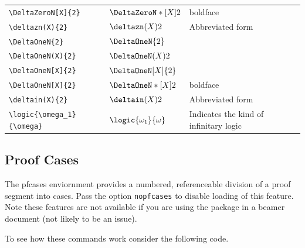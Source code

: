 \documentclass[leqno,11pt]{amsart}
\newcommand{\tab}{\hspace{1cm}}
\begin{document}
\begin{xtabular}{l |  l | l}
	\tab \verb=\DeltaZeroN[X]{2}=           & \( \DeltaZeroN*[X]{2}     \)      & boldface  \\ 
	\tab \verb=\deltazn(X){2}= 							& \( \deltazn(X){2}     \)      & Abbreviated form \\ \midrule
	\verb=\DeltaOneN{2}=                   & \( \DeltaOneN{2}        \)      & \\ 
	\tab \verb=\DeltaOneN(X){2}=           & \( \DeltaOneN(X){2}     \)      & \\ 
	\tab \verb=\DeltaOneN[X]{2}=           & \( \DeltaOneN[X]{2}     \)      & \\
	\tab \verb=\DeltaOneN[X]{2}=           & \( \DeltaOneN*[X]{2}     \)      & boldface  \\ 
	\tab \verb=\deltain(X){2}= 							& \( \deltain(X){2}     \)      & Abbreviated form \\ \midrule

	
	\verb=\logic{\omega_1}{\omega}= & \( \logic{\omega_1}{\omega} \) & Indicates the kind of infinitary logic\\
		\bottomrule
\end{xtabular}

\subsection{Proof Cases}


The pfcases enviornment provides a numbered, referenceable division of a proof segment into cases.  Pass the option \verb=nopfcases= to disable loading of this feature.  Note these features are not available if you are using the package in a beamer document (not likely to be an issue).

To see how these commands work consider the following code.
\end{document}

